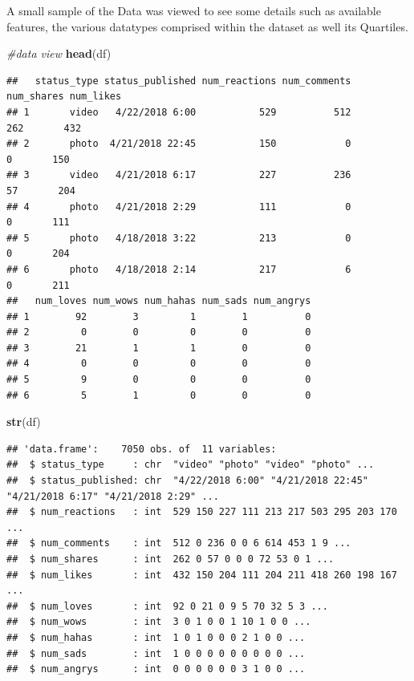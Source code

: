 \documentclass[
]{article}
\newenvironment{Shaded}{\begin{snugshade}}{\end{snugshade}}
\newcommand{\CommentTok}[1]{\textcolor[rgb]{0.56,0.35,0.01}{\textit{#1}}}
\newcommand{\FunctionTok}[1]{\textcolor[rgb]{0.13,0.29,0.53}{\textbf{#1}}}
\newcommand{\NormalTok}[1]{#1}
\begin{document}
A small sample of the Data was viewed to see some details such as
available features, the various datatypes comprised within the dataset
as well its Quartiles.

\begin{Shaded}
\begin{Highlighting}[]
\CommentTok{\#data view}
\FunctionTok{head}\NormalTok{(df)}
\end{Highlighting}
\end{Shaded}

\begin{verbatim}
##   status_type status_published num_reactions num_comments num_shares num_likes
## 1       video   4/22/2018 6:00           529          512        262       432
## 2       photo  4/21/2018 22:45           150            0          0       150
## 3       video   4/21/2018 6:17           227          236         57       204
## 4       photo   4/21/2018 2:29           111            0          0       111
## 5       photo   4/18/2018 3:22           213            0          0       204
## 6       photo   4/18/2018 2:14           217            6          0       211
##   num_loves num_wows num_hahas num_sads num_angrys
## 1        92        3         1        1          0
## 2         0        0         0        0          0
## 3        21        1         1        0          0
## 4         0        0         0        0          0
## 5         9        0         0        0          0
## 6         5        1         0        0          0
\end{verbatim}

\begin{Shaded}
\begin{Highlighting}[]
\FunctionTok{str}\NormalTok{(df)}
\end{Highlighting}
\end{Shaded}

\begin{verbatim}
## 'data.frame':    7050 obs. of  11 variables:
##  $ status_type     : chr  "video" "photo" "video" "photo" ...
##  $ status_published: chr  "4/22/2018 6:00" "4/21/2018 22:45" "4/21/2018 6:17" "4/21/2018 2:29" ...
##  $ num_reactions   : int  529 150 227 111 213 217 503 295 203 170 ...
##  $ num_comments    : int  512 0 236 0 0 6 614 453 1 9 ...
##  $ num_shares      : int  262 0 57 0 0 0 72 53 0 1 ...
##  $ num_likes       : int  432 150 204 111 204 211 418 260 198 167 ...
##  $ num_loves       : int  92 0 21 0 9 5 70 32 5 3 ...
##  $ num_wows        : int  3 0 1 0 0 1 10 1 0 0 ...
##  $ num_hahas       : int  1 0 1 0 0 0 2 1 0 0 ...
##  $ num_sads        : int  1 0 0 0 0 0 0 0 0 0 ...
##  $ num_angrys      : int  0 0 0 0 0 0 3 1 0 0 ...
\end{verbatim}
\end{document}

